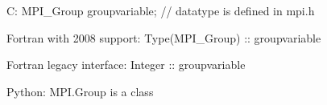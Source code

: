 C:
MPI_Group groupvariable; // datatype is defined in mpi.h

Fortran with 2008 support:
Type(MPI_Group) :: groupvariable

Fortran legacy interface:
Integer :: groupvariable

Python:
MPI.Group is a class
